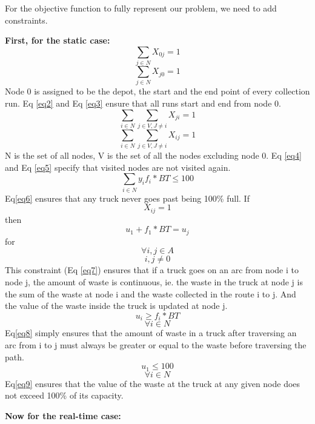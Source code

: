 \documentclass[12pt]{article}
\begin{document}
For the objective function to fully represent our problem, we need to add constraints.

\textbf{First, for the static case:}
\begin{equation}\label{eq2}
    \sum_{j\in N} X_{0 j}=1
\end{equation}
\begin{equation}\label{eq3}
    \sum_{j\in N} X_{j0}=1
\end{equation}
Node 0 is assigned to be the depot, the start and the end point of every collection run. Eq \eqref{eq2} and Eq \eqref{eq3} ensure that all runs start and end from node 0.
\begin{equation}\label{eq4}
    \sum_{i\in N}\sum_{j\in V, J\ne i} X_{ji}=1
\end{equation}
\begin{equation}\label{eq5}
    \sum_{i\in N}\sum_{j\in V, J\ne i} X_{ij}=1
\end{equation}
N is the set of all nodes, V is the set of all the nodes excluding node 0. Eq \eqref{eq4}
and Eq \eqref{eq5} specify that visited nodes are not visited again.
\begin{equation}\label{eq6}
    \sum_{i\in N}{y_{i}f_i*BT}\le100
\end{equation}
Eq\eqref{eq6} ensures that any truck never goes past being 100\% full.
If
$$ X_{ij}=1$$
then
\begin{equation}\label{eq7}
    u_1+f_1*BT =u_j
\end{equation}
for 
$$ \forall i,j \in A$$
$$ i,j\ne 0$$
This constraint (Eq \eqref{eq7}) ensures that if a truck goes on an arc from node i to node j, the amount of waste is continuous, ie. the waste in the truck at node j is the sum of the waste at node i and the waste collected in the route i to j. And the value of the waste inside the truck is updated at node j.
\begin{equation}\label{eq8}
    u_i\ge f_i*BT
\end{equation}
$$  \forall i\in N$$
Eq\eqref{eq8} simply ensures that the amount of waste in a truck after traversing an arc from i to j must always be greater or equal to the waste before traversing the path.
\begin{equation}\label{eq9}
    u_1\le100
\end{equation}
$$\forall i\in N $$
Eq\eqref{eq9} ensures that the value of the waste at the truck at any given node does not exceed 100\% of its capacity.

\textbf{Now for the real-time case:}
\end{document}
